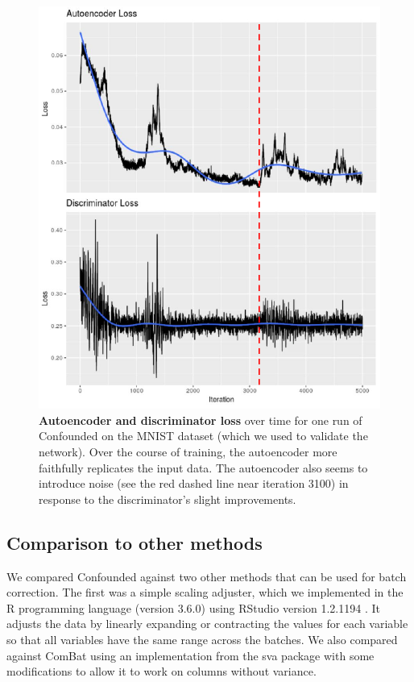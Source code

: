 \documentclass[11pt]{article}
\begin{document}
\begin{figure}
	\centering
	\includegraphics[width=\columnwidth]{figures/final/training_loss.pdf}
	\caption[Autoencoder and discriminator loss]{\textbf{Autoencoder and discriminator loss} over time for one run of Confounded on the MNIST dataset (which we used to validate the network).
	Over the course of training, the autoencoder more faithfully replicates the input data.
	The autoencoder also seems to introduce noise (see the red dashed line near iteration 3100) in response to the discriminator's slight improvements.}
	\label{fig:training_loss}
\end{figure}

\subsection{Comparison to other methods}

We compared Confounded against two other methods that can be used for batch correction. The first was a simple scaling adjuster,
which we implemented in the R programming language (version 3.6.0) \citep{r_core_team_r_2014} using RStudio version 1.2.1194 \citep{rstudio_team_rstudio_2018}.
It adjusts the data by linearly expanding or contracting the values for each variable so that all variables have the same range across the batches.
We also compared against ComBat \citep{johnson_adjusting_2007} using an implementation from the sva package \citep{leek_sva_2017} with some modifications to allow it to work on columns without variance.
\end{document}
